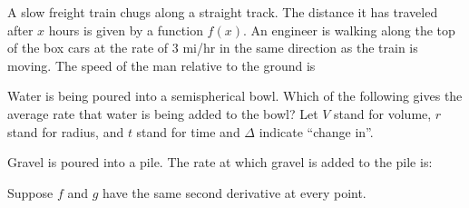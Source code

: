 \documentclass{ximera}
\newcommand{\recommendation}[1]{}
\newcommand{\GoodQuestions}[1]{}
\begin{document}
\begin{problem}
  \recommendation{Vic}

  \GoodQuestions{Subject: Derivatives 9Q}
  A slow freight train chugs along a straight track.  The distance it
  has traveled after $x$ hours is given by a function $f(x)$.  An
  engineer is walking along the top of the box cars at the rate of $3$
  mi/hr in the same direction as the train is moving.  The speed of
  the man relative to the ground is
  \begin{multipleChoice}
  \end{multipleChoice}
\end{problem}




\begin{problem}
  \recommendation{Elizabeth}
  
  Water is being poured into a semispherical bowl.  Which of the
  following gives the average rate that water is being added to the
  bowl?  Let $V$ stand for volume, $r$ stand for radius, and $t$ stand
  for time and $\Delta$ indicate ``change in''.
  \begin{multipleChoice}
  \end{multipleChoice}
\end{problem}


\begin{problem}
  \recommendation{Vic}

  \GoodQuestions{Subject: Derivative Rules 6P}
  Gravel is poured into a pile. The rate at which gravel is added to
  the pile is:
\begin{multipleChoice}
\end{multipleChoice}
\end{problem}





\begin{problem}
  Suppose $f$ and $g$ have the same second derivative at every point.  
  \begin{multipleChoice}
  \end{multipleChoice}
\end{problem}
\end{document}
